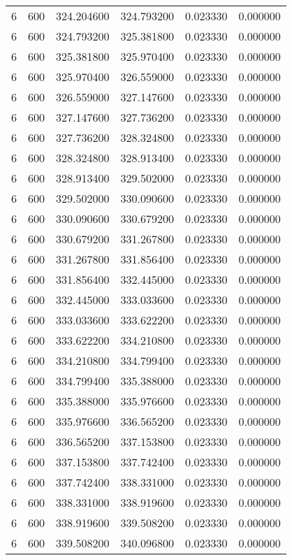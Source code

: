 \begin{longtable}{rrrrrr}
6 & 600 & 324.204600 & 324.793200 & 0.023330 & 0.000000 \\
6 & 600 & 324.793200 & 325.381800 & 0.023330 & 0.000000 \\
6 & 600 & 325.381800 & 325.970400 & 0.023330 & 0.000000 \\
6 & 600 & 325.970400 & 326.559000 & 0.023330 & 0.000000 \\
6 & 600 & 326.559000 & 327.147600 & 0.023330 & 0.000000 \\
6 & 600 & 327.147600 & 327.736200 & 0.023330 & 0.000000 \\
6 & 600 & 327.736200 & 328.324800 & 0.023330 & 0.000000 \\
6 & 600 & 328.324800 & 328.913400 & 0.023330 & 0.000000 \\
6 & 600 & 328.913400 & 329.502000 & 0.023330 & 0.000000 \\
6 & 600 & 329.502000 & 330.090600 & 0.023330 & 0.000000 \\
6 & 600 & 330.090600 & 330.679200 & 0.023330 & 0.000000 \\
6 & 600 & 330.679200 & 331.267800 & 0.023330 & 0.000000 \\
6 & 600 & 331.267800 & 331.856400 & 0.023330 & 0.000000 \\
6 & 600 & 331.856400 & 332.445000 & 0.023330 & 0.000000 \\
6 & 600 & 332.445000 & 333.033600 & 0.023330 & 0.000000 \\
6 & 600 & 333.033600 & 333.622200 & 0.023330 & 0.000000 \\
6 & 600 & 333.622200 & 334.210800 & 0.023330 & 0.000000 \\
6 & 600 & 334.210800 & 334.799400 & 0.023330 & 0.000000 \\
6 & 600 & 334.799400 & 335.388000 & 0.023330 & 0.000000 \\
6 & 600 & 335.388000 & 335.976600 & 0.023330 & 0.000000 \\
6 & 600 & 335.976600 & 336.565200 & 0.023330 & 0.000000 \\
6 & 600 & 336.565200 & 337.153800 & 0.023330 & 0.000000 \\
6 & 600 & 337.153800 & 337.742400 & 0.023330 & 0.000000 \\
6 & 600 & 337.742400 & 338.331000 & 0.023330 & 0.000000 \\
6 & 600 & 338.331000 & 338.919600 & 0.023330 & 0.000000 \\
6 & 600 & 338.919600 & 339.508200 & 0.023330 & 0.000000 \\
6 & 600 & 339.508200 & 340.096800 & 0.023330 & 0.000000 \\

\end{longtable}
